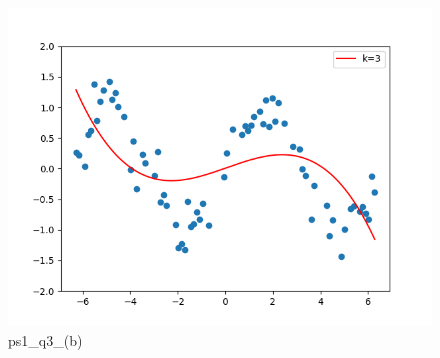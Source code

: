 \begin{answer}

\begin{figure}[H]
    \centering
    \includegraphics[width=0.5\linewidth]{ps1_q3_(b).png}
    \caption{ps1\_q3\_(b)}
    \label{fig:enter-label}
\end{figure}
\end{answer}
